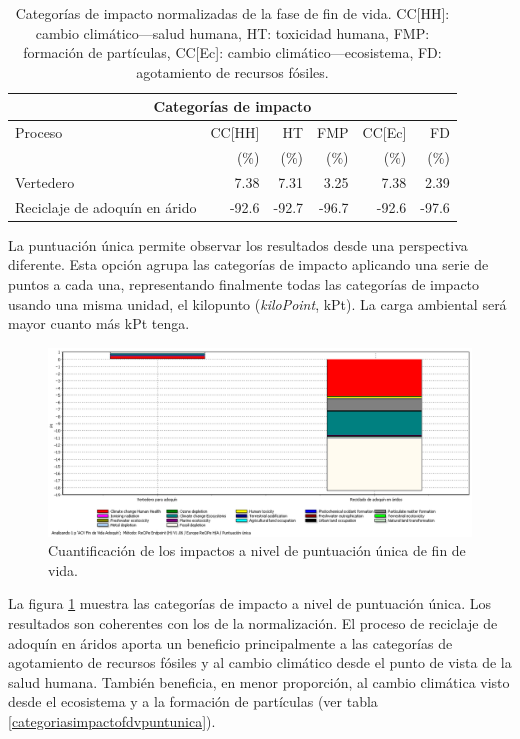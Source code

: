 \begin{table}[!htb]
\centering
\begin{tabular}{p{4cm}rrrrr}
\toprule
\multicolumn{6}{c}{Categorías de impacto}\\
\midrule
Proceso & CC[HH] & HT & FMP & CC[Ec] & FD\\
 & (\%) & (\%) & (\%) & (\%) & (\%)\\
\midrule
Vertedero & 7.38 & 7.31 & 3.25 & 7.38 & 2.39\\
Reciclaje de adoquín en árido & -92.6 & -92.7 & -96.7 & -92.6 & -97.6\\
\bottomrule
\end{tabular}
\caption[Categorías de impacto normalizadas de la fase de fin de vida.]{Categorías de impacto normalizadas de la fase de fin de vida. CC[HH]: cambio climático—salud humana, HT: toxicidad humana, FMP: formación de partículas, CC[Ec]: cambio climático—ecosistema, FD: agotamiento de recursos fósiles.}
\label{categoriasimpactofdv}
\end{table}

La puntuación única permite observar los resultados desde una perspectiva diferente. Esta opción agrupa las categorías de impacto aplicando una serie de puntos a cada una, representando finalmente todas las categorías de impacto usando una misma unidad, el kilopunto (\textit{kiloPoint}, kPt). La carga ambiental será mayor cuanto más kPt tenga.

\begin{figure}[!htb]
\centering
\includegraphics[width=15cm]{img/fdv_puntuacionunica.png}
\caption{Cuantificación de los impactos a nivel de puntuación única de fin de vida.}
\label{fig:fdv_puntuacionunica}
\end{figure}

La figura \ref{fig:fdv_puntuacionunica} muestra las categorías de impacto a nivel de puntuación única. Los resultados son coherentes con los de la normalización. El proceso de reciclaje de adoquín en áridos aporta un beneficio principalmente a las categorías de agotamiento de recursos fósiles y al cambio climático desde el punto de vista de la salud humana. También beneficia, en menor proporción, al cambio climática visto desde el ecosistema y a la formación de partículas (ver tabla \ref{categoriasimpactofdvpuntunica}).

